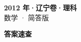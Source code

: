 \documentclass[zihao=-4, a4paper]{ctexart}
\begin{document}
\begin{center}
  {\Large\bfseries 2012 年·辽宁卷·理科}\\[4pt]
  {\large 数学 · 简答版}
\end{center}
\medskip
{}

\clearpage
{}
\begin{center}{\Large\bfseries 答案速查}\end{center}
\medskip

\end{document}
